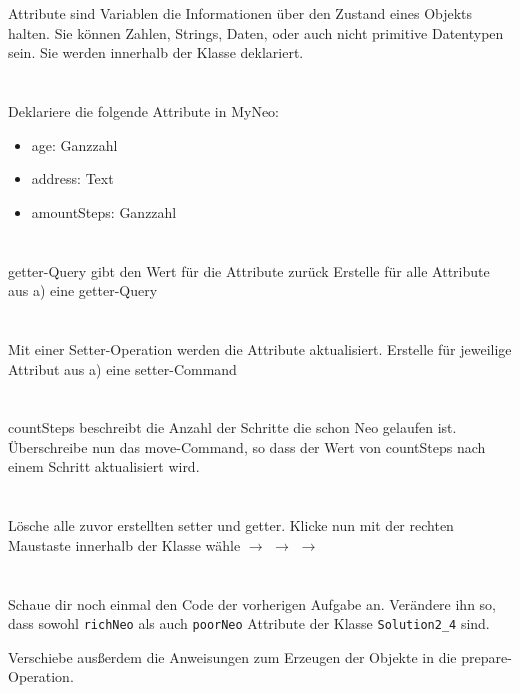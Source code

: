 \begin{questions}


    \renewcommand{\workingtimeMinutes}{20}
    Attribute sind Variablen die Informationen über den Zustand eines Objekts halten. Sie können Zahlen, Strings, Daten, oder auch nicht primitive Datentypen sein. Sie werden innerhalb der Klasse deklariert.
    \begin{parts}
    \part{}
    Deklariere die folgende Attribute in MyNeo:
    \begin{itemize}
    \item age: Ganzzahl
    \item address: Text
    \item amountSteps: Ganzzahl
    \end{itemize}
    \part{}
    getter-Query gibt den Wert für die Attribute zurück
    \newline Erstelle für alle Attribute aus a) eine getter-Query
    \part{}
    Mit einer Setter-Operation werden die Attribute aktualisiert.
    Erstelle für jeweilige Attribut aus a) eine setter-Command
    \part{}countSteps beschreibt die Anzahl der Schritte die schon Neo gelaufen ist. Überschreibe nun das move-Command, so dass der Wert von     countSteps nach einem Schritt aktualisiert wird.
    \part{}
    Lösche alle zuvor erstellten setter und getter. Klicke nun mit der rechten Maustaste innerhalb der Klasse wähle  $\to$  $\to$  $\to$ 
    \part{}
    Schaue dir noch einmal den Code der vorherigen Aufgabe an.
    Verändere ihn so, dass sowohl \lstinline{richNeo} als auch \lstinline{poorNeo} Attribute der Klasse \lstinline{Solution2_4} sind.

    Verschiebe ausßerdem die Anweisungen zum Erzeugen der Objekte in die prepare-Operation.
    \end{parts}
\end{questions}
